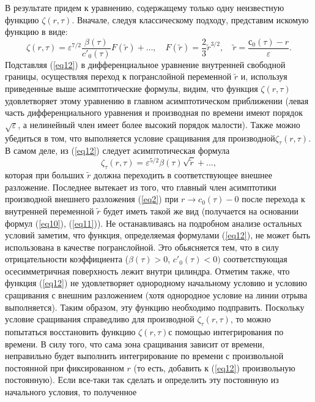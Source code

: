 \documentclass[press]{vestnik}
\begin{document}
В результате придем к уравнению, содержащему только одну неизвестную функцию 
$\zeta (r,\tau )$. Вначале, следуя классическому подходу, представим искомую 
функцию в виде:
\begin{equation}
\label{eq12}
\zeta (r,\tau )=\varepsilon^{7/2}\frac{\beta (\tau )}{{c}'_{0} (\tau 
)}F(\tilde{{r}})+\ldots,
\quad
F(\tilde{{r}})=\frac{2}{3}\tilde{{r}}^{3/2},
\quad
\tilde{{r}}=
\frac{с_{0} (\tau )-r}{\varepsilon }.
\end{equation}
Подставляя (\ref{eq12}) в дифференциальное уравнение внутренней свободной границы, 
осуществляя переход к погранслойной переменной $\tilde{{r}}$ и, используя 
приведенные выше асимптотические формулы, видим, что функция $\zeta (r,\tau 
)$ удовлетворяет этому уравнению в главном асимптотическом приближении (левая 
часть дифференциального уравнения и производная по времени имеют порядок 
$\sqrt \varepsilon $, а нелинейный член имеет более высокий порядок 
малости). Также можно убедиться в том, что выполняется условие сращивания 
для производной$\zeta_{\tau } (r,\tau )$. В самом деле, из (\ref{eq12}) следует 
асимптотическая формула 
\[
\zeta_{\tau } (r,\tau )=\varepsilon^{5/2}\beta (\tau )\sqrt {\tilde{{r}}} 
+\ldots,
\]
которая при больших $\tilde{{r}}$ должна переходить в соответствующее внешнее 
разложение. Последнее вытекает из того, что главный член асимптотики 
производной внешнего разложения (\ref{eq2}) при $r\to c_{0} (\tau )-0$ после 
перехода к внутренней переменной $\tilde{{r}}$ будет иметь такой же вид 
(получается на основании формул (\ref{eq10}), (\ref{eq11})). Не останавливаясь на 
подробном анализе остальных условий заметим, что функция, определяемая 
формулами (\ref{eq12}), не может быть использована в качестве погранслойной. Это 
обьясняется тем, что в силу отрицательности коэффициента ($\beta (\tau )>0$, 
${c}'_{0} (\tau )<0)$ соответствующая осесимметричная поверхность лежит 
внутри цилиндра. Отметим также, что функция (\ref{eq12}) не удовлетворяет 
однородному начальному условию и условию сращивания с внешним разложением 
(хотя однородное условие на линии отрыва выполняется). Таким образом, эту 
функцию необходимо подправить. Поскольку условие сращивания справедливо для 
производной $\zeta_{\tau } (r,\tau )$, то можно попытаться восстановить 
функцию $\zeta (r,\tau )$с помощью интегрирования по времени. В силу того, 
что сама зона сращивания зависит от времени, неправильно будет выполнить 
интегрирование по времени с произвольной постоянной при фиксированном $r$ 
(то есть, добавить к (\ref{eq12}) произвольную постоянную). Если все-таки так 
сделать и определить эту постоянную из начального условия, то полученное 
\end{document}
